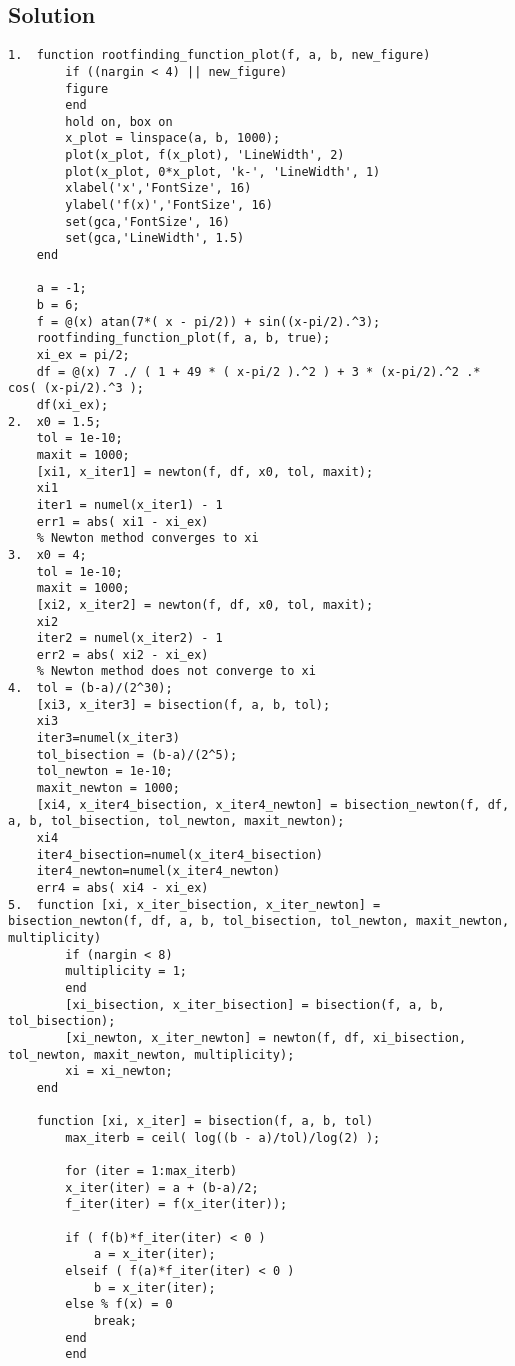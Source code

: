 \documentclass[12pt, a4paper]{report}
\begin{document}
    \subsection*{Solution}
        \begin{lstlisting}[style=Matlab]
1.  function rootfinding_function_plot(f, a, b, new_figure)
        if ((nargin < 4) || new_figure)
        figure
        end
        hold on, box on
        x_plot = linspace(a, b, 1000);
        plot(x_plot, f(x_plot), 'LineWidth', 2)
        plot(x_plot, 0*x_plot, 'k-', 'LineWidth', 1)
        xlabel('x','FontSize', 16)
        ylabel('f(x)','FontSize', 16)
        set(gca,'FontSize', 16)
        set(gca,'LineWidth', 1.5)
    end

    a = -1;
    b = 6;
    f = @(x) atan(7*( x - pi/2)) + sin((x-pi/2).^3);
    rootfinding_function_plot(f, a, b, true);
    xi_ex = pi/2;
    df = @(x) 7 ./ ( 1 + 49 * ( x-pi/2 ).^2 ) + 3 * (x-pi/2).^2 .* cos( (x-pi/2).^3 );
    df(xi_ex); 
2.  x0 = 1.5;
    tol = 1e-10;
    maxit = 1000;
    [xi1, x_iter1] = newton(f, df, x0, tol, maxit);
    xi1
    iter1 = numel(x_iter1) - 1
    err1 = abs( xi1 - xi_ex)
    % Newton method converges to xi
3.  x0 = 4;
    tol = 1e-10;
    maxit = 1000;
    [xi2, x_iter2] = newton(f, df, x0, tol, maxit);
    xi2
    iter2 = numel(x_iter2) - 1
    err2 = abs( xi2 - xi_ex)
    % Newton method does not converge to xi
4.  tol = (b-a)/(2^30);
    [xi3, x_iter3] = bisection(f, a, b, tol);
    xi3
    iter3=numel(x_iter3)  
    tol_bisection = (b-a)/(2^5);
    tol_newton = 1e-10;
    maxit_newton = 1000;
    [xi4, x_iter4_bisection, x_iter4_newton] = bisection_newton(f, df, a, b, tol_bisection, tol_newton, maxit_newton);
    xi4
    iter4_bisection=numel(x_iter4_bisection)
    iter4_newton=numel(x_iter4_newton)
    err4 = abs( xi4 - xi_ex)
5.  function [xi, x_iter_bisection, x_iter_newton] = bisection_newton(f, df, a, b, tol_bisection, tol_newton, maxit_newton, multiplicity)
        if (nargin < 8)
        multiplicity = 1;
        end
        [xi_bisection, x_iter_bisection] = bisection(f, a, b, tol_bisection);
        [xi_newton, x_iter_newton] = newton(f, df, xi_bisection, tol_newton, maxit_newton, multiplicity);
        xi = xi_newton;
    end

    function [xi, x_iter] = bisection(f, a, b, tol)
        max_iterb = ceil( log((b - a)/tol)/log(2) );

        for (iter = 1:max_iterb)
        x_iter(iter) = a + (b-a)/2;
        f_iter(iter) = f(x_iter(iter));

        if ( f(b)*f_iter(iter) < 0 )
            a = x_iter(iter);
        elseif ( f(a)*f_iter(iter) < 0 )
            b = x_iter(iter);
        else % f(x) = 0
            break;
        end
        end


\end{lstlisting}
\end{document}
